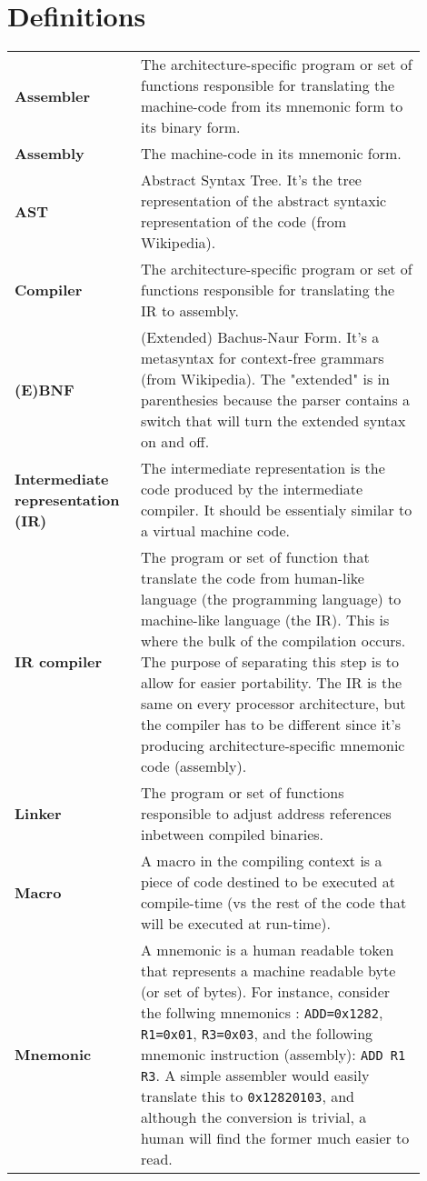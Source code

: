 \documentclass{article}
\begin{document}
\section*{Definitions}
\renewcommand{\arraystretch}{1.5}
\begin{longtable}{>{\bfseries}p{0.25\linewidth}p{0.65\linewidth}}
  Assembler & The architecture-specific program or set of functions responsible for translating the machine-code from its mnemonic form to its binary form.\\
  Assembly & The machine-code in its mnemonic form.\\
  AST & Abstract Syntax Tree. It's the tree representation of the abstract syntaxic representation of the code (from Wikipedia).\\
  Compiler & The architecture-specific program or set of functions responsible for translating the IR to assembly.\\
  (E)BNF & (Extended) Bachus-Naur Form. It's a metasyntax for context-free grammars (from Wikipedia). The "extended" is in parenthesies because the parser contains a switch that will turn the extended syntax on and off.\\
  Intermediate representation (IR) & The intermediate representation is the code produced by the intermediate compiler. It should be essentialy similar to a virtual machine code.\\
  IR compiler & The program or set of function that translate the code from human-like language (the programming language) to machine-like language (the IR). This is where the bulk of the compilation occurs. The purpose of separating this step is to allow for easier portability. The IR is the same on every processor architecture, but the compiler has to be different since it's producing architecture-specific mnemonic code (assembly).\\
  Linker & The program or set of functions responsible to adjust address references inbetween compiled binaries.\\
  Macro & A macro in the compiling context is a piece of code destined to be executed at compile-time (vs the rest of the code that will be executed at run-time).\\
  Mnemonic & A mnemonic is a human readable token that represents a machine readable byte (or set of bytes). For instance, consider the follwing mnemonics : \texttt{ADD=0x1282}, \texttt{R1=0x01}, \texttt{R3=0x03}, and the following mnemonic instruction (assembly): \texttt{ADD R1 R3}. A simple assembler would easily translate this to \texttt{0x12820103}, and although the conversion is trivial, a human will find the former much easier to read.\\

\end{longtable}
\end{document}
